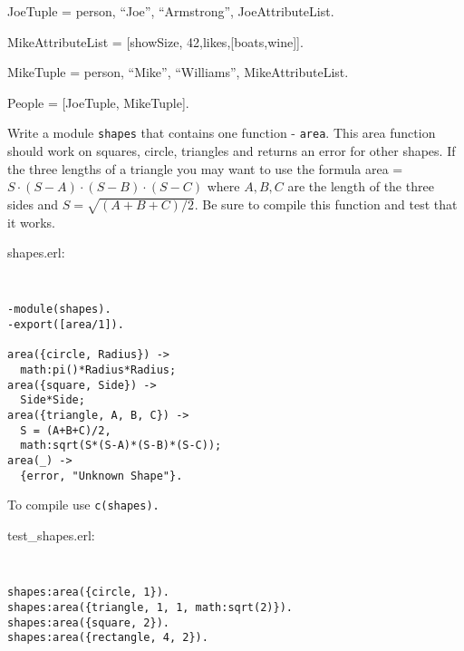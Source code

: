 \begin{questions}
\begin{solution}
{    JoeTuple = {person, ``Joe'', ``Armstrong'', JoeAttributeList}.

    MikeAttributeList = [{showSize, 42},{likes,[boats,wine]}].

    MikeTuple = {person, ``Mike'', ``Williams'', MikeAttributeList}.

    People = [JoeTuple, MikeTuple].
    }
    \end{solution}

    \question[10] Write a module {\tt shapes} that
    contains one function - {\tt area}. This area function should work
    on squares, circle, triangles and returns an error for other
    shapes. If the three lengths of a triangle you may want to use the
    formula area = $S \cdot (S-A) \cdot (S-B) \cdot (S-C)$ where $A,              
    B, C$ are the length of the three sides and $S = \sqrt{ (A+B+C)/2             
    }$. Be sure to compile this function and test that it works.

    \begin{solution}
    shapes.erl:
{\tt
\begin{verbatim}                                                                  
-module(shapes).                                                                  
-export([area/1]).                                                                
                                                                                  
area({circle, Radius}) ->                                                         
  math:pi()*Radius*Radius;                                                        
area({square, Side}) ->                                                           
  Side*Side;                                                                      
area({triangle, A, B, C}) ->                                                      
  S = (A+B+C)/2,                                                                  
  math:sqrt(S*(S-A)*(S-B)*(S-C));                                                 
area(_) ->                                                                        
  {error, "Unknown Shape"}.                                                       
\end{verbatim}
}

    To compile use {\tt c(shapes).}

    test\_shapes.erl:
{\tt
\begin{verbatim}                                                                  
shapes:area({circle, 1}).                                                         
shapes:area({triangle, 1, 1, math:sqrt(2)}).                                      
shapes:area({square, 2}).                                                         
shapes:area({rectangle, 4, 2}).                                                   
\end{verbatim}
}


\end{solution}
\end{questions}
